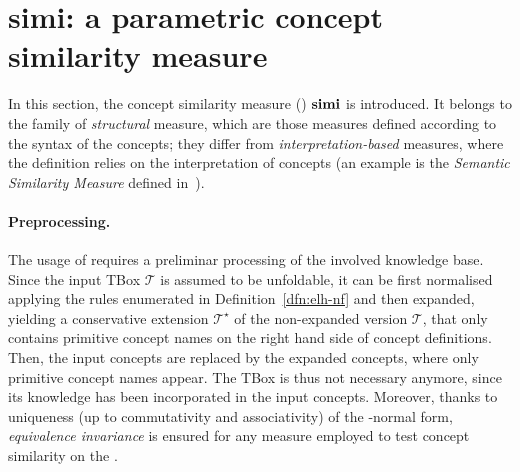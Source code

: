 \section{simi: a parametric concept similarity measure}
\label{sec:simi}

In this section, the concept similarity measure (\csm) \(\mathbf{simi}\) is introduced.
It belongs to the family of \emph{structural} measure, which are those measures defined according to the syntax of the concepts; they differ from \emph{interpretation-based} measures, where the definition relies on the interpretation of concepts (an example is the \emph{Semantic Similarity Measure} defined in~\cite{SemSim}).

  \paragraph{Preprocessing.}
  The usage of \simi requires a preliminar processing of the involved knowledge base.
  Since the input TBox \(\mathcal{T}\) is assumed to be unfoldable, it can be first normalised applying the rules enumerated in Definition~\ref{dfn:elh-nf} and then expanded, yielding a conservative extension \(\mathcal{T}^\star\) of the non-expanded version \(\mathcal{T}\), that only contains primitive concept names on the right hand side of concept definitions.
  Then, the input concepts are replaced by the expanded concepts, where only primitive concept names appear.
  The TBox is thus not necessary anymore, since its knowledge has been incorporated in the input concepts.
  Moreover, thanks to uniqueness (up to commutativity and associativity) of the \elh-normal form, \emph{equivalence invariance} is ensured for any measure employed to test concept similarity on the \kb.

